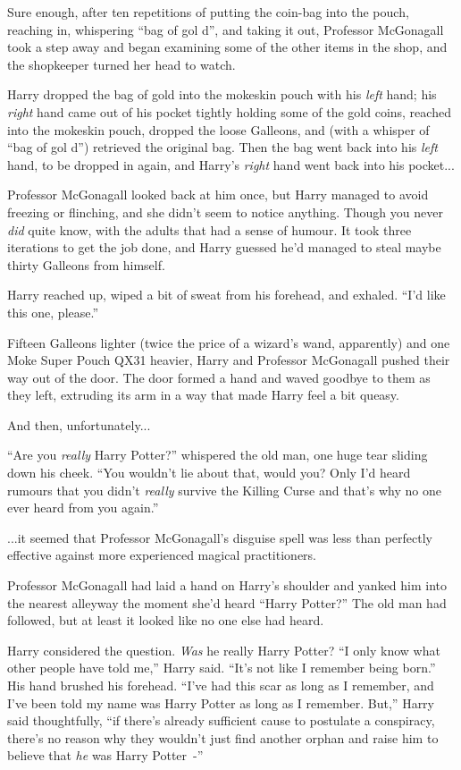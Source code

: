 Sure enough, after ten repetitions of putting the coin-bag into the pouch, reaching in, whispering ``bag of gol d'', and taking it out, Professor McGonagall took a step away and began examining some of the other items in the shop, and the shopkeeper turned her head to watch.

Harry dropped the bag of gold into the mokeskin pouch with his \emph{left} hand; his \emph{right} hand came out of his pocket tightly holding some of the gold coins, reached into the mokeskin pouch, dropped the loose Galleons, and (with a whisper of ``bag of gol d'') retrieved the original bag. Then the bag went back into his \emph{left} hand, to be dropped in again, and Harry's \emph{right} hand went back into his pocket...

Professor McGonagall looked back at him once, but Harry managed to avoid freezing or flinching, and she didn't seem to notice anything. Though you never \emph{did} quite know, with the adults that had a sense of humour. It took three iterations to get the job done, and Harry guessed he'd managed to steal maybe thirty Galleons from himself.

Harry reached up, wiped a bit of sweat from his forehead, and exhaled. ``I'd like this one, please.''

Fifteen Galleons lighter (twice the price of a wizard's wand, apparently) and one Moke Super Pouch QX31 heavier, Harry and Professor McGonagall pushed their way out of the door. The door formed a hand and waved goodbye to them as they left, extruding its arm in a way that made Harry feel a bit queasy.

And then, unfortunately...

``Are you \emph{really} Harry Potter?'' whispered the old man, one huge tear sliding down his cheek. ``You wouldn't lie about that, would you? Only I'd heard rumours that you didn't \emph{really} survive the Killing Curse and that's why no one ever heard from you again.''

...it seemed that Professor McGonagall's disguise spell was less than perfectly effective against more experienced magical practitioners.

Professor McGonagall had laid a hand on Harry's shoulder and yanked him into the nearest alleyway the moment she'd heard ``Harry Potter?'' The old man had followed, but at least it looked like no one else had heard.

Harry considered the question. \emph{Was} he really Harry Potter? ``I only know what other people have told me,'' Harry said. ``It's not like I remember being born.'' His hand brushed his forehead. ``I've had this scar as long as I remember, and I've been told my name was Harry Potter as long as I remember. But,'' Harry said thoughtfully, ``if there's already sufficient cause to postulate a conspiracy, there's no reason why they wouldn't just find another orphan and raise him to believe that \emph{he} was Harry Potter~-''


